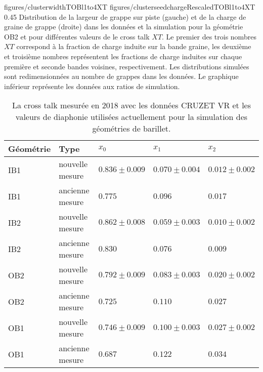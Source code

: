                 {figures/clusterwidthTOBl1to4XT}
                 {figures/clusterseedchargeRescaledTOBl1to4XT} %
                 {0.45}       %
                 {Distribution de la largeur de grappe sur piste (gauche) et de la charge de graine de grappe (droite) dans les données et la simulation pour la géométrie OB2 et pour différentes valeurs de le cross talk $XT$. Le premier des trois nombres $XT$ correspond à la fraction de charge induite sur la bande graine, les deuxième et troisième nombres représentent les fractions de charge induites sur chaque première et seconde bandes voisines, respectivement. Les distributions simulées sont redimensionnées au nombre de grappes dans les données. Le graphique inférieur représente les données aux ratios de simulation.}

\begin{table}[h]
\begin{center}
\begin{tabular}{|l|l|l|l|l|}
\hline
Géométrie & Type & $x_{0}$ & $x_{1}$ & $x_{2}$ \\
\hline
\hline
IB1 & nouvelle mesure & $ 0.836 \pm 0.009 $ & $0.070 \pm 0.004 $ & $0.012 \pm 0.002 $ \\
IB1 & ancienne mesure & $ 0.775 $ & $ 0.096 $ & $0.017 $  \\
\hline
IB2 &  nouvelle mesure & $0.862 \pm 0.008 $ & $0.059 \pm 0.003 $ & $0.010 \pm  0.002 $  \\
IB2 &  ancienne mesure &  $0.830 $ & $0.076 $ & $ 0.009$   \\
\hline
OB2 &  nouvelle mesure & $0.792 \pm 0.009 $ & $0.083 \pm 0.003 $ & $0.020 \pm 0.002$  \\
OB2 &  ancienne mesure &   $0.725 $ & $0.110 $ & $ 0.027 $  \\
\hline
OB1 &  nouvelle mesure &  $0.746 \pm 0.009 $ & $0.100 \pm 0.003 $ & $0.027 \pm 0.002 $  \\
OB1 &  ancienne mesure &  $0.687 $ & $0.122 $ & $ 0.034 $ \\
\hline
\end{tabular}
\caption[Table caption text]{La cross talk mesurée en 2018 avec les données CRUZET VR et les valeurs de diaphonie utilisées actuellement pour la simulation des géométries de barillet. }
\label{tab:measuredXtalk2}
\end{center}
\end{table}

